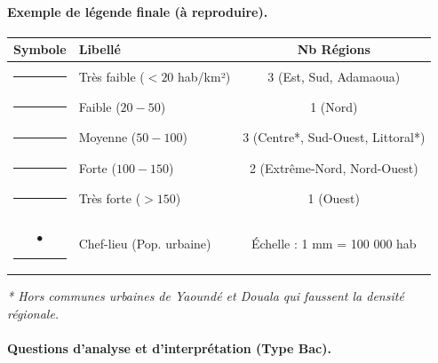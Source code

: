 \documentclass[11pt]{article}
\begin{document}
\paragraph{Exemple de légende finale (à reproduire).}

\begin{center}
\begin{tabular}{|c|l|c|}\hline
\textbf{Symbole} & \textbf{Libellé} & \textbf{Nb Régions} \\ \hline
\textcolor{popgoldL!80}{\rule{8pt}{8pt}} & Très faible ($< 20$ hab/km²) & 3 (Est, Sud, Adamaoua) \\ \hline
\textcolor{poporangeL!60}{\rule{8pt}{8pt}} & Faible ($20 - 50$) & 1 (Nord) \\ \hline
\textcolor{poporange!60}{\rule{8pt}{8pt}} & Moyenne ($50 - 100$) & 3 (Centre*, Sud-Ouest, Littoral*) \\ \hline
\textcolor{poppink!60}{\rule{8pt}{8pt}} & Forte ($100 - 150$) & 2 (Extrême-Nord, Nord-Ouest) \\ \hline
\textcolor{poppink}{\rule{8pt}{8pt}} & Très forte ($> 150$) & 1 (Ouest) \\ \hline
{\large $\bullet$} \textcolor{popdark}{\rule{4pt}{4pt}} & Chef-lieu (Pop. urbaine) & Échelle : 1 mm = 100 000 hab \\ \hline
\end{tabular}
\end{center}
\emph{* Hors communes urbaines de Yaoundé et Douala qui faussent la densité régionale.}

\paragraph{Questions d'analyse et d'interprétation (Type Bac).}
\end{document}
